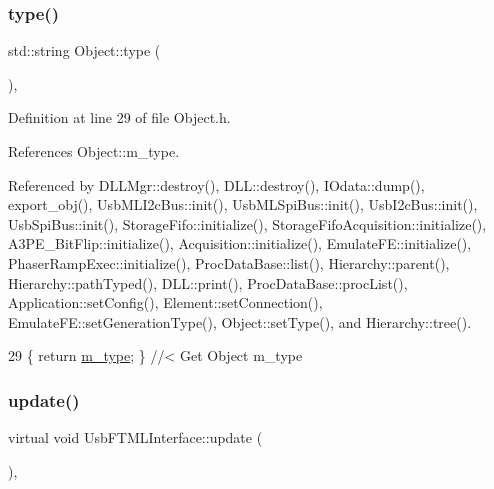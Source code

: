 \subsubsection{\texorpdfstring{type()}{type()}}
{\footnotesize\ttfamily std\+::string Object\+::type (\begin{DoxyParamCaption}{ }\end{DoxyParamCaption})\hspace{0.3cm}{\ttfamily [inline]}, {\ttfamily [inherited]}}



Definition at line 29 of file Object.\+h.



References Object\+::m\+\_\+type.



Referenced by D\+L\+L\+Mgr\+::destroy(), D\+L\+L\+::destroy(), I\+Odata\+::dump(), export\+\_\+obj(), Usb\+M\+L\+I2c\+Bus\+::init(), Usb\+M\+L\+Spi\+Bus\+::init(), Usb\+I2c\+Bus\+::init(), Usb\+Spi\+Bus\+::init(), Storage\+Fifo\+::initialize(), Storage\+Fifo\+Acquisition\+::initialize(), A3\+P\+E\+\_\+\+Bit\+Flip\+::initialize(), Acquisition\+::initialize(), Emulate\+F\+E\+::initialize(), Phaser\+Ramp\+Exec\+::initialize(), Proc\+Data\+Base\+::list(), Hierarchy\+::parent(), Hierarchy\+::path\+Typed(), D\+L\+L\+::print(), Proc\+Data\+Base\+::proc\+List(), Application\+::set\+Config(), Element\+::set\+Connection(), Emulate\+F\+E\+::set\+Generation\+Type(), Object\+::set\+Type(), and Hierarchy\+::tree().


\begin{DoxyCode}
29 \{ \textcolor{keywordflow}{return} \hyperlink{classObject_a457a600fe8c00eb1034374f75110a78c}{m\_type};       \} \textcolor{comment}{//< Get Object m\_type}
\end{DoxyCode}
\mbox{\label{classUsbFTMLInterface_a941ba5a5c0f398e5d26c97bb4111510d}} 
\subsubsection{\texorpdfstring{update()}{update()}}
{\footnotesize\ttfamily virtual void Usb\+F\+T\+M\+L\+Interface\+::update (\begin{DoxyParamCaption}{ }\end{DoxyParamCaption})\hspace{0.3cm}{\ttfamily [inline]}, {\ttfamily [virtual]}}

